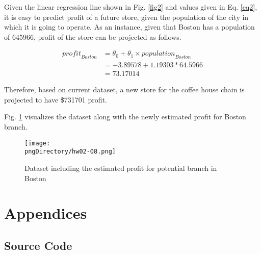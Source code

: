 \documentclass[12pt,letterpaper,twoside]{article}
\begin{document}
Given the linear regression line shown in Fig. \ref{fig2} and values given in Eq. \ref{eq2}, it is easy to predict profit of a future store, given the population of the city in which it is going to operate.
As an instance, given that Boston has a population of 645966, profit of the store can be projected as follows.

\begin{equation}\label{eq5}
\begin{split}
\mathit{profit}_\mathit{Boston} & = \theta_0 + \theta_1 \times \mathit{population}_\mathit{Boston} \\
 & = -3.89578 + 1.19303 * 64.5966 \\
 & = 73.17014
\end{split}
\end{equation}

Therefore, based on current dataset, a new store for the coffee house chain is projected to have \$731701 profit.

Fig. \ref{fig6} visualizes the dataset along with the newly estimated profit for Boston branch.

\begin{figure}[H]\centering
\texttt{[image: \\pngDirectory/hw02-08.png]}
\caption{Dataset including the estimated profit for potential branch in Boston}\label{fig6}
\end{figure}

\cleardoublepage

\section*{Appendices}

\subsection*{Source Code}

\lstset{language=r,tabsize=4}

\end{document}
